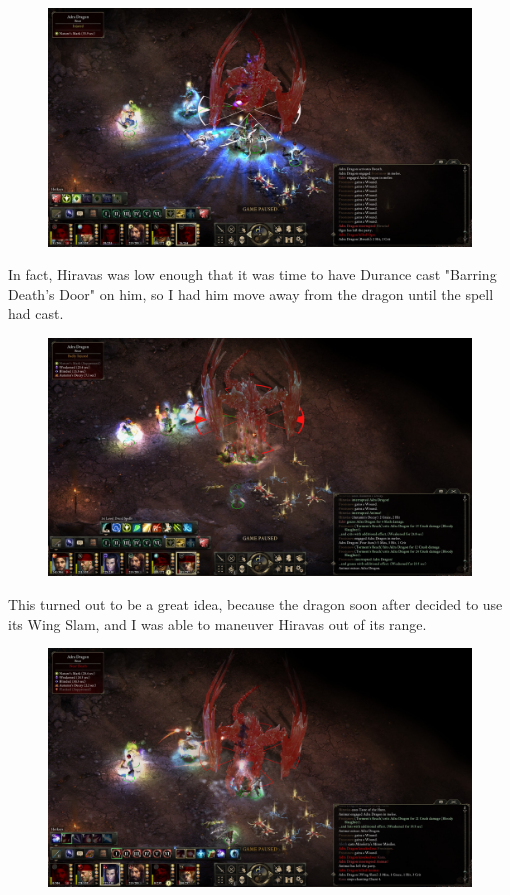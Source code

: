 \documentclass{article}
\begin{document}
\begin{figure}
\includegraphics[scale=0.33]{files/blog/2019_03_17_pillars_of_eternity_path_of_the_damned_act_iv/2019_03_17_dragon2_10.jpg}
\end{figure}

In fact, Hiravas was low enough that it was time to have Durance cast "Barring Death's Door" on him, so I had him move away from the dragon until the spell had cast.

\begin{figure}
\includegraphics[scale=0.33]{files/blog/2019_03_17_pillars_of_eternity_path_of_the_damned_act_iv/2019_03_17_dragon2_11.jpg}
\end{figure}

This turned out to be a great idea, because the dragon soon after decided to use its Wing Slam, and I was able to maneuver Hiravas out of its range.

\begin{figure}
\includegraphics[scale=0.33]{files/blog/2019_03_17_pillars_of_eternity_path_of_the_damned_act_iv/2019_03_17_dragon2_12.jpg}
\end{figure}
\end{document}
